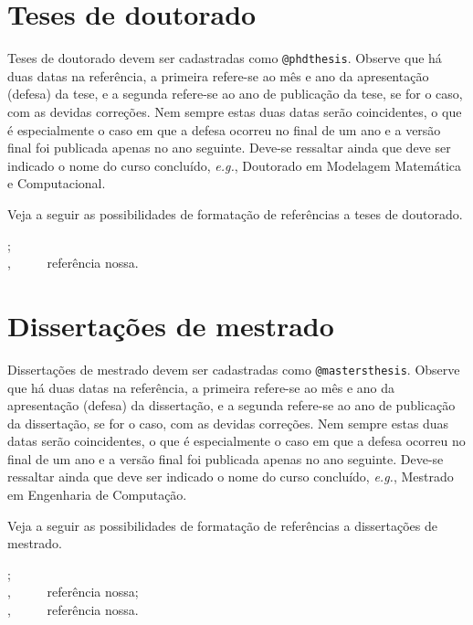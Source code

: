 \begin{apendicesenv}
\section{Teses de doutorado}
\label{sec:phdthesis}

Teses de doutorado devem ser cadastradas como \verb|@phdthesis|. Observe que há duas datas na referência, a primeira refere-se ao mês e ano da apresentação (defesa) da tese, e a segunda refere-se ao ano de publicação da tese, se for o caso, com as devidas correções. Nem sempre estas duas datas serão coincidentes, o que é especialmente o caso em que a defesa ocorreu no final de um ano e a versão final foi publicada apenas no ano seguinte. Deve-se ressaltar ainda que deve ser indicado o nome do curso concluído, \textit{e.g.}, Doutorado em Modelagem Matemática e Computacional.

Veja a seguir as possibilidades de formatação de referências a teses de doutorado.

{\small
	\cite{barcelos1998} ;\\
	\cite{Neubert2001} ,   \ \ \ \ \ referência nossa.\\
}



\section{Dissertações de mestrado}
\label{sec:mastersthesis}

Dissertações de mestrado devem ser cadastradas como \verb|@mastersthesis|. Observe que há duas datas na referência, a primeira refere-se ao mês e ano da apresentação (defesa) da dissertação, e a segunda refere-se ao ano de publicação da dissertação, se for o caso, com as devidas correções. Nem sempre estas duas datas serão coincidentes, o que é especialmente o caso em que a defesa ocorreu no final de um ano e a versão final foi publicada apenas no ano seguinte. Deve-se ressaltar ainda que deve ser indicado o nome do curso concluído, \textit{e.g.}, Mestrado em Engenharia de Computação.

Veja a seguir as possibilidades de formatação de referências a dissertações de mestrado.

{\small
	\cite{araujo1986} ;\\
	\cite{Santos2003} ,   \ \ \ \ \ referência nossa;\\
	\cite{Souza2012} ,   \ \ \ \ \ referência nossa.\\
}




\end{apendicesenv}
